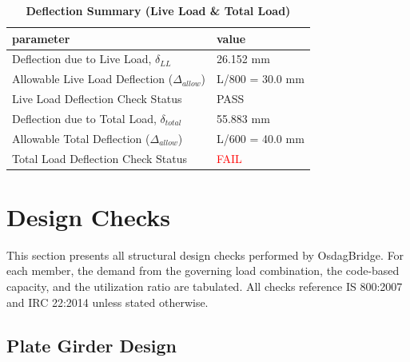 \documentclass[12pt,a4paper]{report}
\numberwithin{table}{chapter}
\numberwithin{figure}{chapter}
\begin{document}
\vspace{1em}
\begin{longtable}{|L{7cm}|p{8.5cm}|}
\caption{\textbf{Deflection Summary (Live Load \& Total Load)}}
\hline
\textbf{parameter} & \textbf{value} \\
\hline
\textnormal{Deflection due to Live Load, $\delta_{LL}$} & 26.152 mm \\[6pt]
\hline
\textnormal{Allowable Live Load Deflection ($\Delta_{allow}$)} & L/800 = 30.0 mm \\[6pt]
\hline
\textnormal{Live Load Deflection Check Status} & PASS \\[6pt]
\hline
\textnormal{Deflection due to Total Load, $\delta_{total}$} & 55.883 mm \\[6pt]
\hline
\textnormal{Allowable Total Deflection ($\Delta_{allow}$)} & L/600 = 40.0 mm \\[6pt]
\hline
\textnormal{Total Load Deflection Check Status} & \textcolor{red}{FAIL} \\[6pt]
\hline
\end{longtable}

\vspace{1em}
\noindent
\noindent{}
\noindent{}
\noindent{}


\chapter{Design Checks}

This section presents all structural design checks performed by OsdagBridge. For each member, the demand from the governing load combination, the code-based capacity, and the utilization ratio are tabulated. All checks reference IS 800:2007 and IRC 22:2014 unless stated otherwise.

\section{Plate Girder Design}
\label{sec:plate-girder}
\end{document}
